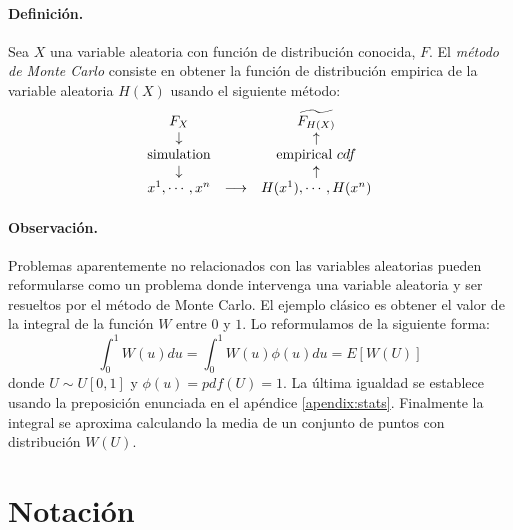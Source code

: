 \paragraph{Definici\'on.} Sea $X$ una variable aleatoria con funci\'on de 
distribuci\'on conocida, $F$. El \emph{m\'etodo de Monte Carlo} consiste en obtener la funci\'on de distribuci\'on empirica de
la variable aleatoria $H(X)$ usando el siguiente m\'etodo:
\begin{displaymath}
\begin{array}{ccc}
F_X                  &     \quad         & \widetilde{F_{H(X)}}   \cr
\downarrow         &     \quad         & \uparrow                \cr
\textrm{simulation} &     \quad         & \textrm{empirical } cdf \cr
\downarrow         &     \quad         & \uparrow                \cr
x^1,\cdots,x^n      & \longrightarrow & H(x^1),\cdots,H(x^n)  
\end{array}
\end{displaymath}

\paragraph{Observaci\'on.} Problemas aparentemente no relacionados con las 
variables aleatorias pueden reformularse como un problema donde intervenga
una variable aleatoria y ser resueltos por el m\'etodo de Monte Carlo. El 
ejemplo cl\'asico es obtener el valor de la integral de la funci\'on $W$ entre 
$0$ y $1$. Lo reformulamos de la siguiente forma:
\begin{displaymath}
\int_{0}^{1} W(u) du = \int_{0}^{1} W(u) \phi(u) du = E[W(U)]
\end{displaymath}
donde $U \sim U[0,1]$ y $\phi(u) = pdf(U) = 1$. La \'ultima igualdad se establece 
usando la preposici\'on enunciada en el ap\'endice \ref{apendix:stats}. 
Finalmente la integral se aproxima calculando la media de un conjunto de puntos 
con distribuci\'on $W(U)$.



\section{Notaci\'on}

